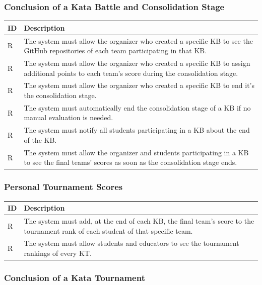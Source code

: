 \documentclass[11pt]{report}
\newcounter{rcounter}
\newcommand{\rc}{
    \addtocounter{rcounter}{1}
    R\arabic{rcounter}
}
\begin{document}
\subsubsection*{Conclusion of a Kata Battle and Consolidation Stage}

\begin{longtable}[h] {|p{10mm}|p{130mm}|}
\hline
\rowcolor{gray!20}
\textbf{ID} & \textbf{Description} \\ \hline
    \rc & The system must allow the organizer who created a specific KB to see the GitHub repositories of each team participating in that KB\@.
    \\ \hline
    \rc & The system must allow the organizer who created a specific KB to assign additional points to each team's score during the consolidation stage.
    \\ \hline
    \rc & The system must allow the organizer who created a specific KB to end it's the consolidation stage.
    \\ \hline
    \rc & The system must automatically end the consolidation stage of a KB if no manual evaluation is needed.
    \\ \hline
    \rc & The system must notify all students participating in a KB about the end of the KB\@.
    \\ \hline
    \rc & The system must allow the organizer and students participating in a KB to see the final teams' scores as soon as the consolidation stage ends.
    \\ \hline
\end{longtable}

\newpage
\subsubsection*{Personal Tournament Scores}

\begin{longtable}[h] {|p{10mm}|p{130mm}|}
\hline
\rowcolor{gray!20}
\textbf{ID} & \textbf{Description} \\ \hline
    \rc & The system must add, at the end of each KB, the final team's score to the tournament rank of each student of that specific team.
    \\ \hline
    \rc & The system must allow students and educators to see the tournament rankings of every KT\@.
    \\ \hline
\end{longtable}

\subsubsection*{Conclusion of a Kata Tournament}
\end{document}
